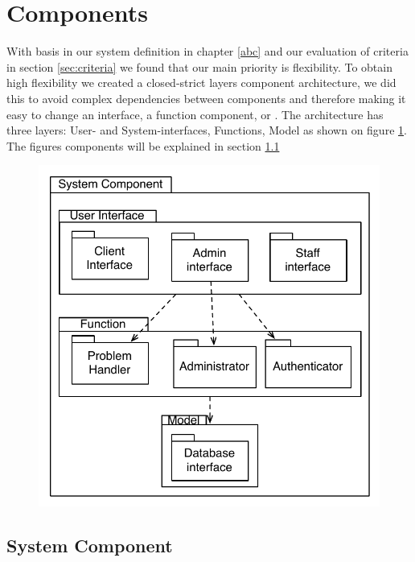 \section{Components}

With basis in our system definition in chapter \ref{abc} and our evaluation of criteria in section \ref{sec:criteria} we found that our main priority is flexibility. To obtain high flexibility we created a closed-strict layers component architecture, we did this to avoid complex dependencies between components and therefore making it easy to change an interface, a function component, or . 
The architecture has three layers: User- and System-interfaces, Functions, Model as shown on figure \ref{fig:SystemComponent}. The figures components will be explained in section \ref{sub:SystemComponent} 

\begin{figure}[]
	\centering
		\includegraphics[scale=0.5]{input/architectural_design/system_component_denvibruger.pdf}
	\label{fig:SystemComponent}
\end{figure}


\subsection{System Component}
\label{sub:SystemComponent}

